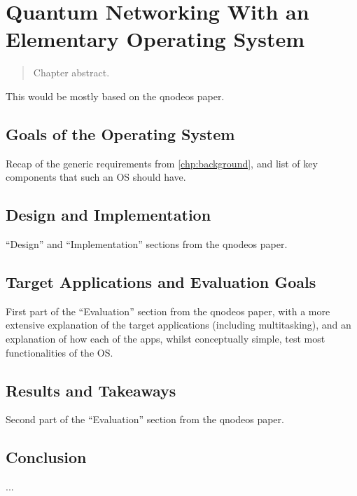 \chapter{Quantum Networking With an Elementary Operating System}
\label{chp:qnodeos}

\begin{abstract}
Chapter abstract.
\end{abstract}


\newpage


\noindent
This would be mostly based on the \acrshort{qnodeos} paper.

\section{Goals of the Operating System}

Recap of the generic requirements from \cref{chp:background}, and list of key components that such
an OS should have.

\section{Design and Implementation}

``Design'' and ``Implementation'' sections from the \acrshort{qnodeos} paper.

\section{Target Applications and Evaluation Goals}

First part of the ``Evaluation'' section from the \acrshort{qnodeos} paper, with a more extensive
explanation of the target applications (including multitasking), and an explanation of how each of
the apps, whilst conceptually simple, test most functionalities of the OS.

\section{Results and Takeaways}

Second part of the ``Evaluation'' section from the \acrshort{qnodeos} paper.

\section{Conclusion}

...

\printbibliography[heading=subbibintoc,title={References}]
